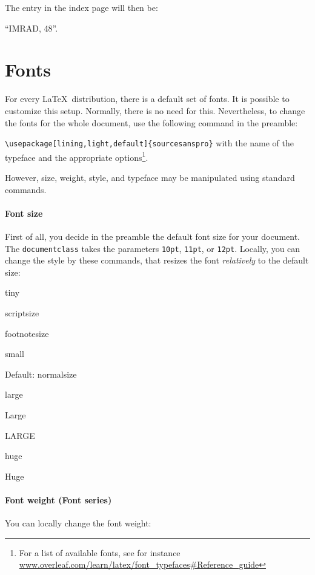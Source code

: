 The entry in the index page will then be:  

``IMRAD, 48''.

\section{Fonts}

For every  \LaTeX\ distribution, there is a default set of fonts.
It is possible to customize this setup.
Normally, there is no need for this.
Nevertheless, to change the fonts for the whole document, use the following command in the preamble:

\verb|\usepackage[lining,light,default]{sourcesanspro}|
with the name of the typeface and the appropriate options\footnote{For a list of available fonts, see for instance \url{www.overleaf.com/learn/latex/font_typefaces\#Reference_guide}}.

However, size, weight, style, and typeface may be manipulated using standard commands.

\paragraph{Font size}

First of all, you decide in the preamble the default font size for your document. The \texttt{documentclass} takes the parameters \texttt{10pt},  \texttt{11pt},  or \texttt{12pt}. Locally, you can change the style by these commands, that resizes the font {\em relatively} to the default size:

    \tiny tiny
    
    \scriptsize scriptsize
    
    \footnotesize footnotesize
    
    \small small
    
    \normalsize Default: normalsize
    
    \large  large
    
    \Large Large
    
    \LARGE LARGE
    
    \huge huge
    
    \Huge  Huge
    
    \normalsize 
    
\paragraph{Font weight (Font series)}
You can locally change the font weight:
    
